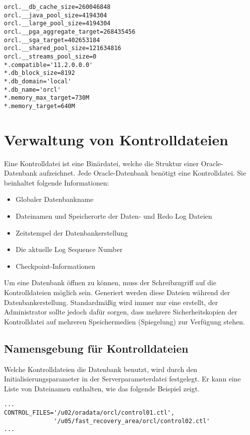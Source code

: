 \clearpage
        \begin{lstlisting}[caption={Auszug aus einer Parameterdatei},label=admin24,language=terminal]
orcl.__db_cache_size=260046848
orcl.__java_pool_size=4194304
orcl.__large_pool_size=4194304
orcl.__pga_aggregate_target=268435456
orcl.__sga_target=402653184
orcl.__shared_pool_size=121634816
orcl.__streams_pool_size=0
*.compatible='11.2.0.0.0'
*.db_block_size=8192
*.db_domain='local'
*.db_name='orcl'
*.memory_max_target=730M
*.memory_target=640M
        \end{lstlisting}
    \section{Verwaltung von Kontrolldateien}
      Eine Kontrolldatei ist eine Binärdatei, welche die Struktur einer Oracle-Datenbank aufzeichnet. Jede Oracle-Datenbank benötigt eine Kontrolldatei. Sie beinhaltet folgende Informationen:
      \begin{itemize}
        \item Globaler Datenbankname
        \item Dateinamen und Speicherorte der Daten- und Redo Log Dateien
        \item Zeitstempel der Datenbankerstellung
        \item Die aktuelle Log Sequence Number
        \item Checkpoint-Informationen
      \end{itemize}
      Um eine Datenbank öffnen zu können, muss der Schreibzugriff auf die Kontrolldateien möglich sein. Generiert werden diese Dateien während der Datenbankerstellung. Standardmäßig wird immer nur eine erstellt, der Administrator sollte jedoch dafür sorgen, dass mehrere Sicherheitskopien der Kontrolldatei auf mehreren Speichermedien (Spiegelung) zur Verfügung stehen.
      \subsection{Namensgebung für Kontrolldateien}
        Welche Kontrolldateien die Datenbank benutzt, wird durch den Initialisierungsparameter  in der Serverparameterdatei festgelegt. Er kann eine Liste von Dateinamen enthalten, wie das folgende Beispiel zeigt.
\clearpage
				\begin{lstlisting}[caption={Der Parameter \parameter{control\_files}},label=admin25,language=terminal]
...
CONTROL_FILES='/u02/oradata/orcl/control01.ctl',
              '/u05/fast_recovery_area/orcl/control02.ctl'
...
        \end{lstlisting}
   
